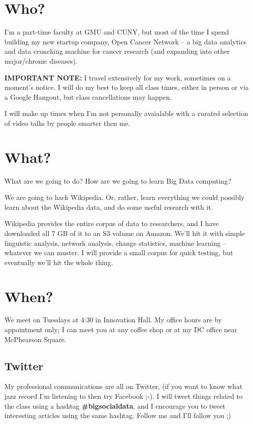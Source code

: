 \documentclass[12pt]{article}
\begin{document}
\section{Who?}

I'm a part-time faculty at GMU and CUNY, but most of the time I spend building my new startup company, Open Cancer Network -- a big data analytics and data crunching machine for cancer research (and expanding into other major/chronic diseases). 

{\bf IMPORTANT NOTE:} I travel extensively for my work, sometimes on a moment's notice. I will do my best to keep all class times, either in person or via a Google Hangout, but class cancellations may happen. 

I will make up times when I'm not personally avaialable with a curated selection of video talks by people smarter then me. 

\section{What?}

What are we going to do? How are we going to learn Big Data computing?

We are going to hack Wikipedia. Or, rather, learn everything we could possibly learn about the Wikipedia data, and do some useful research with it. 

Wikipedia provides the entire corpus of data to researchers, and I have downloaded all 7 GB of it to an S3 volume on Amazon. We'll hit it with simple linguistic analysis, network analysis, change statistics, machine learning -- whatever we can muster.  I will provide a small corpus for quick testing, but eventually we'll hit the whole thing.

\section{When?}

We meet on Tuesdays at 4:30 in Innovation Hall. My office hours are by appointment only; I can meet you at any coffee shop or at my DC office near McPhearson Square. 

\subsection{Twitter}

My professional communications are all on Twitter, {\bf {}} (if you want to know what jazz record I'm listening to then try Facebook ;-). I will tweet things related to the class using a hashtag {\bf \#bigsocialdata}, and I encourage you to tweet interesting articles using the same hashtag. Follow me and I'll follow you ;)
\end{document}
